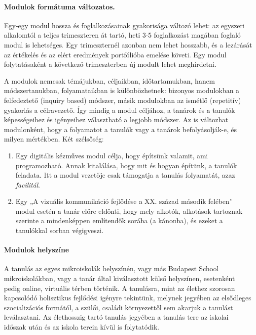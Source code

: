 \paragraph{Modulok formátuma változatos.}
Egy-egy modul hossza és foglalkozásainak gyakorisága változó lehet: az egyszeri alkalomtól a teljes trimeszteren át tartó, heti 3-5 foglalkozást magában foglaló modul is lehetséges. Egy trimeszternél azonban nem lehet hosszabb, és a lezárását az értékelés és az elért eredmények portfólióba emelése követi. Egy modul folytatásaként a következő trimeszterben új modult lehet meghirdetni.


A modulok nemcsak témájukban, céljaikban, ídőtartamukban, hanem módszertanukban, folyamataikban is különbözhetnek: bizonyos modulokban a felfedeztető (inquiry based) módszer, másik modulokban az ismétlő (repetitív) gyakorlás a célravezető. Így mindig a modul céljához, a tanárok és a tanulók képességeihez és igényeihez választható a legjobb módszer. Az is változhat modulonként, hogy a folyamatot a tanulók vagy a tanárok befolyásolják-e, és milyen mértékben. Két szélsőség:
\begin{enumerate}
\item Egy digitális kézműves modul célja, hogy építsünk valamit, ami programozható. Annak kitalálása, hogy mit és hogyan építünk, a tanulók feladata. Itt a modul vezetője csak támogatja a tanulás folyamatát, azaz \emph{facilitál}.

\item Egy „A vizuális kommunikáció fejlődése a XX. század második felében" modul esetén a tanár előre eldönti, hogy mely alkotók, alkotások tartoznak szerinte a mindenképpen említendők sorába (a kánonba), és ezeket a tanulókkal sorban végigveszi.
\end{enumerate}

\paragraph {Modulok helyszíne}

A tanulás az egyes mikroiskolák helyszínén, vagy más Budapest School mikroiskolákban, vagy a tanár által kiválasztott külső helyszínen, esetenként pedig online, virtuális térben történik. A tanulásra, mint az élethez szorosan kapcsolódó holisztikus fejlődési igényre tekintünk, melynek jegyében az elsődleges szocializációs formától, a szülői, családi környezettől sem akarjuk a tanulást leválasztani. Az élethosszig tartó tanulás jegyében a tanulás tere az iskolai időszak után és az iskola terein kívül is folytatódik.


